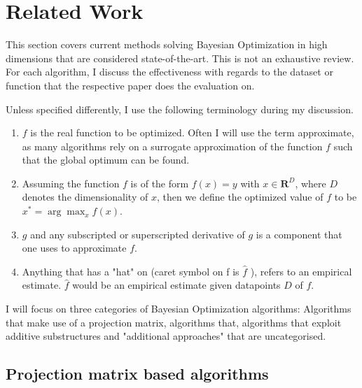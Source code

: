 
\chapter{Related Work}

\ifpdf
    \graphicspath{{04_Chapter2/Figs/Raster/}{04_Chapter2/Figs/PDF/}{04_Chapter2/Figs/}}
\else
    \graphicspath{{04_Chapter2/Figs/Vector/}{04_Chapter2/Figs/}}
\fi

This section covers current methods solving Bayesian Optimization in high dimensions that are considered state-of-the-art.
This is not an exhaustive review. 
For each algorithm, I discuss the effectiveness with regards to the dataset or function that the respective paper does the evaluation on.

Unless specified differently, I use the following terminology during my discussion.

\begin{enumerate}
\item $f$ is the real function to be optimized. Often I will use the term approximate, as many algorithms rely on a surrogate approximation of the function $f$ such that the global optimum can be found.
\item Assuming the function $f$ is of the form $f(x) = y$ with $x \in \mathbf{R}^D$, where $D$ denotes the dimensionality of $x$, then we define the optimized value of $f$ to be $x^* = \arg \max_{x} f(x)$.
\item $g$ and any subscripted or superscripted derivative of $g$ is a component that one uses to approximate $f$.
\item Anything that has a "hat" on (caret symbol on f is $\hat{f}$ ), refers to an empirical estimate. 
$\hat{f}$ would be an empirical estimate given datapoints $\mathit{D}$ of $f$.
\end{enumerate}

I will focus on three categories of Bayesian Optimization algorithms: Algorithms that make use of a projection matrix, algorithms that, algorithms that exploit additive substructures and "additional approaches" that are uncategorised.

\section{Projection matrix based algorithms}

